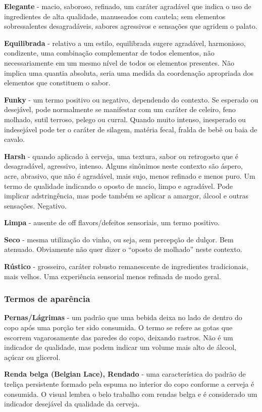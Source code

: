 \textbf{Elegante} - macio, saboroso, refinado, um caráter agradável que indica o uso de ingredientes de alta qualidade, manuseados com cautela; sem elementos sobressalentes desagradáveis, sabores agressivos e sensações que agridem o palato.

\textbf{Equilibrada} - relativo a um estilo, equilibrada sugere agradável, harmonioso, condizente, uma combinação complementar de todos elementos, não necessariamente em um mesmo nível de todos os elementos presentes. Não implica uma quantia absoluta, seria uma medida da coordenação apropriada dos elementos que constituem o sabor.

\textbf{Funky} - um termo positivo ou negativo, dependendo do contexto. Se esperado ou desejável, pode normalmente se manifestar com um caráter de celeiro, feno molhado, sutil terroso, pelego ou curral. Quando muito intenso, inesperado ou indesejável pode ter o caráter de silagem, matéria fecal, fralda de bebê ou baia de cavalo.

\textbf{Harsh} - quando aplicado à cerveja, uma textura, sabor ou retrogosto que é desagradável, agressivo, intenso. Alguns sinônimos neste contexto são áspero, acre, abrasivo, que não é agradável, mais sujo, menos refinado e menos puro. Um termo de qualidade indicando o oposto de macio, limpo e agradável. Pode implicar adstringência, mas pode também se aplicar a amargor, álcool e outras sensações. Negativo.

\textbf{Limpa} - ausente de off flavors/defeitos sensoriais, um termo positivo.

\textbf{Seco} - mesma utilização do vinho, ou seja, sem percepção de dulçor. Bem atenuado. Obviamente não quer dizer o “oposto de molhado” neste contexto.

\textbf{Rústico} - grosseiro, caráter robusto remanescente de ingredientes tradicionais, mais velhos. Uma experiência sensorial menos refinada de modo geral.

\subsubsection*{Termos de aparência}
\textbf{Pernas/Lágrimas} - um padrão que uma bebida deixa no lado de dentro do copo após uma porção ter sido consumida. O termo se refere as gotas que escorrem vagarosamente das paredes do copo, deixando rastros. Não é um indicador de qualidade, mas podem indicar um volume mais alto de álcool, açúcar ou glicerol.

\textbf{Renda belga (Belgian Lace), Rendado} - uma característica do padrão de treliça persistente formado pela espuma no interior do copo conforme a cerveja é consumida. O visual lembra o belo trabalho com rendas belga e é considerado um indicador desejável da qualidade da cerveja.
